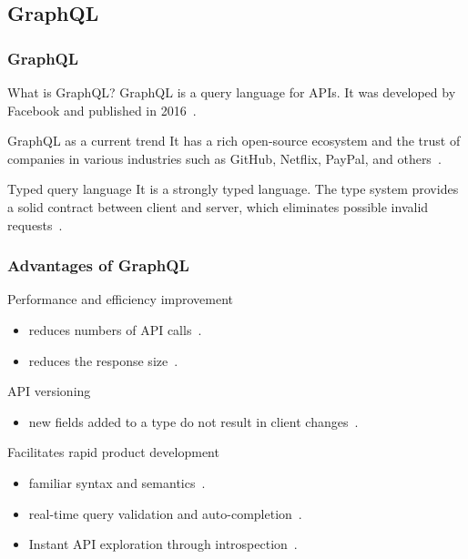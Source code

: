 \subsection{GraphQL}

\begin{frame}\frametitle{GraphQL}

  \begin{block}{What is GraphQL?}
    GraphQL is a query language for APIs. It was developed by Facebook and published in 2016~\cite{initial-analysis-of-gql,gql-spec}. 
  \end{block}

  \begin{block}{GraphQL as a current trend}
    It has a rich open-source ecosystem and the trust of companies in various industries such as GitHub, Netflix, PayPal, and others~\cite{morph-gql-1}.
  \end{block}

\begin{block}{Typed query language}
  It is a strongly typed language. The type system provides a solid contract between client and server, which eliminates possible invalid requests~\cite{real-time-sys-arc-based-on-gql}.
\end{block}

\end{frame}

\begin{frame}\frametitle{Advantages of GraphQL}

\begin{block}{Performance and efficiency improvement}
\begin{itemize}
  \item reduces numbers of API calls~\cite{migrating-to-gql}.
  \item reduces the response size~\cite{migrating-to-gql}.
\end{itemize}
\end{block}

\begin{block}{API versioning}
\begin{itemize}
  \item new fields added to a type do not result in client changes~\cite{migrating-to-gql}. 
\end{itemize}

\end{block}

\begin{block}{Facilitates rapid product development}
\begin{itemize}
  \item familiar syntax and semantics~\cite{rest-vs-gql-controlled-experiment}.
  \item real-time query validation and auto-completion~\cite{rest-vs-gql-controlled-experiment,migrating-to-gql}.
  \item Instant API exploration through introspection~\cite{migrating-to-gql}. 
\end{itemize}

\end{block}

\end{frame}

